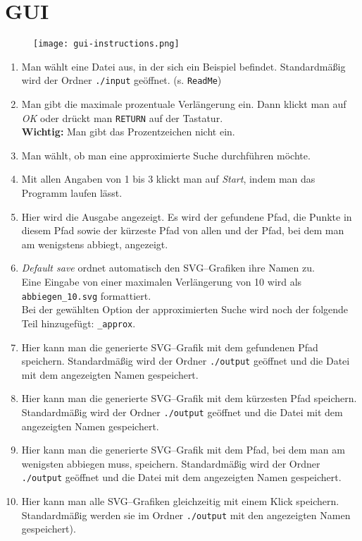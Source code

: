 \documentclass[a4paper,10pt,ngerman]{scrartcl}
\begin{document}
\newpage
\section{GUI}

\begin{figure}[h]
\centering
\texttt{[image: gui-instructions.png]}
\end{figure}

\begin{enumerate}
  \item Man wählt eine Datei aus, in der sich ein Beispiel befindet. Standardmäßig wird
  der Ordner \texttt{./input} geöffnet. (s. \texttt{ReadMe})
  \item Man gibt die maximale prozentuale Verlängerung ein.
  Dann klickt man auf \textit{OK} oder drückt
man \texttt{RETURN} auf der Tastatur.\\ \textbf{Wichtig:} Man gibt das Prozentzeichen nicht ein.
  \item Man wählt, ob man eine approximierte Suche durchführen möchte.
  \item Mit allen Angaben von 1 bis 3 klickt man auf \textit{Start}, indem man das Programm laufen lässt.
  \item Hier wird die Ausgabe angezeigt. Es wird der gefundene Pfad, die Punkte in diesem Pfad sowie
  der kürzeste Pfad von allen und der Pfad, bei dem man am wenigstens abbiegt, angezeigt.
  \item \textit{Default save} ordnet automatisch den SVG--Grafiken ihre Namen zu.\\
  Eine Eingabe von einer maximalen Verlängerung von 10 wird als \texttt{abbiegen\_10.svg} formattiert.\\
  Bei der gewählten Option der approximierten Suche wird noch der folgende Teil hinzugefügt: \texttt{\_approx}.
  \item Hier kann man die generierte SVG--Grafik mit dem gefundenen Pfad speichern. Standardmäßig wird der Ordner
\texttt{./output} geöffnet und die Datei mit dem angezeigten Namen gespeichert.
  \item Hier kann man die generierte SVG--Grafik mit dem kürzesten Pfad speichern. Standardmäßig wird der Ordner
\texttt{./output} geöffnet  und die Datei mit dem angezeigten Namen gespeichert.
  \item Hier kann man die generierte SVG--Grafik mit dem Pfad, bei dem man am wenigsten abbiegen muss, speichern. Standardmäßig wird der Ordner
\texttt{./output} geöffnet und die Datei mit dem angezeigten Namen gespeichert.
  \item Hier kann man alle SVG--Grafiken gleichzeitig mit einem Klick speichern. Standardmäßig werden sie im Ordner
\texttt{./output} mit den angezeigten Namen gespeichert).
\end{enumerate}
\end{document}
